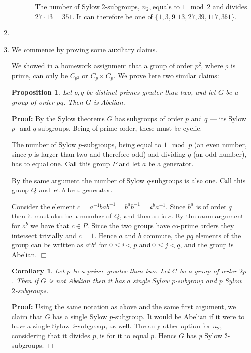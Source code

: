 \documentclass[11pt]{article} \usepackage{amssymb}
\newtheorem{proposition}[theorem]{Proposition}
\newtheorem{corollary}[theorem]{Corollary}
\newenvironment{proof}{\noindent \textbf{Proof:}}{$\Box$}
\begin{document}
\begin{enumerate}
\begin{enumerate}
\begin{itemize}
      The number of Sylow 2-subgroups, $n_2$, equals to $1\mod 2$ and divides
      $27\cdot 13=351$. It can therefore be one of 
      $\{1,3,9,13,27,39,117,351\}$. 
    \end{itemize}
    \end{enumerate}
  \item
  \item
    We commence by proving some auxiliary claims. 

    We showed in a homework assignment that a group of order $p^2$, where
    $p$ is prime, can only be $C_{p^2}$ or $C_p \times C_p$. We prove here
    two similar claims:
    \begin{proposition}
      \label{prop:byprime}
      Let $p,q$ be distinct primes greater than two, and let $G$ be a group 
      of order $pq$. Then $G$ is Abelian.
    \end{proposition}
    \begin{proof}
      By the Sylow theorems $G$ has subgroups of order $p$ and $q$ --- its 
      Sylow $p$- and $q$-subgroups.
      Being of prime order, these must be cyclic.
      
      The number of Sylow $p$-subgroups, 
      being equal to $1\mod p$ (an even number, since $p$ is larger than two
      and therefore odd) and dividing $q$ (an odd number), 
      has to equal one. Call this group $P$ and let $a$ be a generator.
      
      By the same argument the number of Sylow $q$-subgroups is also one.
      Call this group $Q$ and let $b$ be a generator.
      
      Consider the element $c=a^{-1}bab^{-1}=b^ab^{-1}=a^ba^{-1}$. Since
      $b^a$ is of order $q$ then it must also be a member of $Q$, and then
      so is $c$. By the same argument for $a^b$ we have that $c \in P$. Since
      the two groups have co-prime orders they intersect trivially and $c=1$. 
      Hence $a$ and $b$ commute, the $pq$ elements of the group can be written 
      as $a^ib^j$ for $0\leq i <p$ and $0\leq j < q$, and the group is Abelian.
    \end{proof}
    \begin{corollary}
      \label{prop:2p_groups}
      Let $p$ be a prime greater than two. Let $G$ be a group of order
      $2p$. Then if $G$ is not Abelian then it has a single Sylow $p$-subgroup
      and $p$ Sylow $2$-subgroups.
    \end{corollary}
    \begin{proof}
      Using the same notation as above and the same first argument, we claim
      that $G$ has a single Sylow $p$-subgroup. It would be Abelian if it were 
      to have a single Sylow $2$-subgroup, as well. The only other option for
      $n_2$, considering that it divides $p$, is for it to equal $p$. Hence
      $G$ has $p$ Sylow $2$-subgroups.
    \end{proof}


\end{enumerate}
\end{document}
